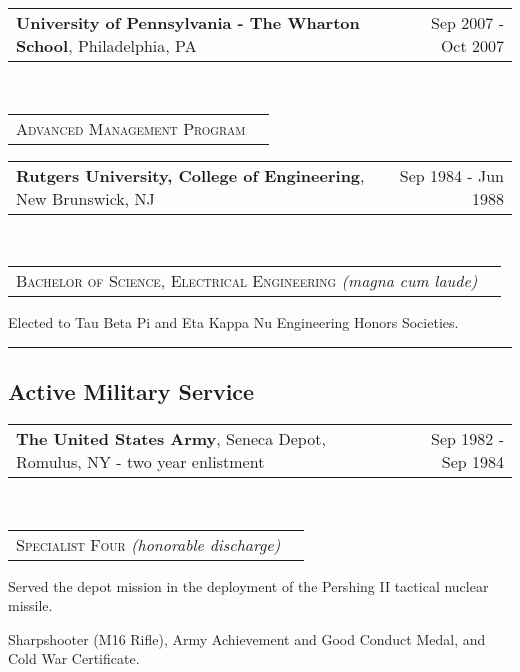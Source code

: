\documentclass[10pt,letterpaper]{extarticle}
\makeatletter
\newcommand{\headerrow}[2]
{\begin{tabular*}{\linewidth}{l@{\extracolsep{\fill}}r}
	#1 &
	#2 \\
\end{tabular*}}
\makeatother
\begin{document}
	\item[]
	\headerrow
		{\large \textbf{University of Pennsylvania - The Wharton School}, Philadelphia, PA}
		{Sep 2007 - Oct 2007}
	\\
	\headerrow
		{\large \textsc{Advanced Management Program}}
		{}
	\item[]
	\headerrow
		{\large \textbf{Rutgers University, College of Engineering}, New Brunswick, NJ}
		{Sep 1984 - Jun 1988}
	\\
	\headerrow
		{\large \textsc{Bachelor of Science, Electrical Engineering} \emph{(magna cum laude)}}
		{}
	\vspace{-1.8em}\begin{itemize*}
		\item Elected to Tau Beta Pi and Eta Kappa Nu Engineering Honors Societies.
	\end{itemize*}

\hrule
\vspace{-1em}\subsection*{\Large Active Military Service}\vspace{-0.5em}
	
	\item[]
	\headerrow
		{\large \textbf{The United States Army}, Seneca Depot, Romulus, NY - two year enlistment}
		{Sep 1982 - Sep 1984}
	\\
	\headerrow
		{\large \textsc{Specialist Four} \emph{(honorable discharge)}}
		{}
	\vspace{-2em}\begin{itemize*}
		\item Served the depot mission in the deployment of the Pershing II tactical nuclear
		missile.
		\item Sharpshooter (M16 Rifle), Army Achievement and Good Conduct Medal, and Cold War
		Certificate.
	\end{itemize*}
\end{document}
